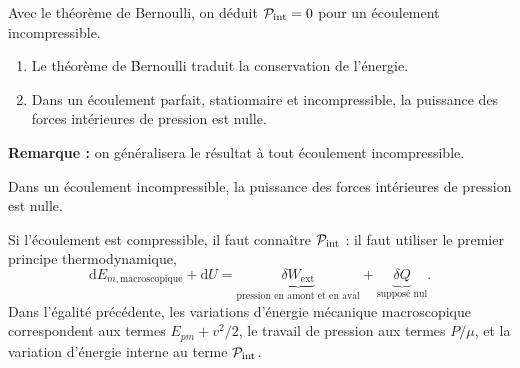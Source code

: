 \documentclass[11pt,a4paper]{article}
\newcommand{\dd}{\mathrm d}
\newcommand{\etoiles}[1]{\foreach \i in {1,...,#1}{\mathord{\star}\,}}
\begin{document}
Avec le théorème de Bernoulli, on déduit $\mathcal P_{\mathrm{int}}=0$ pour un écoulement incompressible.
\begin{cadre}\begin{enumerate}\item Le théorème de Bernoulli traduit la conservation de l'énergie.
\item Dans un écoulement parfait, stationnaire et incompressible, la puissance des forces intérieures de pression est nulle.\end{enumerate}\end{cadre}
\textbf{Remarque :} on généralisera le résultat à tout écoulement incompressible.
\begin{cadre}[etoiles={\etoiles{2}}]Dans un écoulement incompressible, la puissance des forces intérieures de pression est nulle.\end{cadre}
Si l'écoulement est compressible, il faut connaître $\mathcal P_{\mathrm{int}}$ : il faut utiliser le premier principe thermodynamique,
\[\dd E_{m,\mathrm{macroscopique}}+\dd U=\underbrace{\delta W_{\mathrm{ext}}}_{\text{pression en amont et en aval}}+\underbrace{\delta Q}_{\text{supposé nul}}.\]
Dans l'égalité précédente, les variations d'énergie mécanique macroscopique correspondent aux termes $E_{pm}+v^2/2$, le travail de pression aux termes $P/\mu$, et la variation d'énergie interne au terme $\mathcal P_{\mathrm{int}}$.
\end{document}
